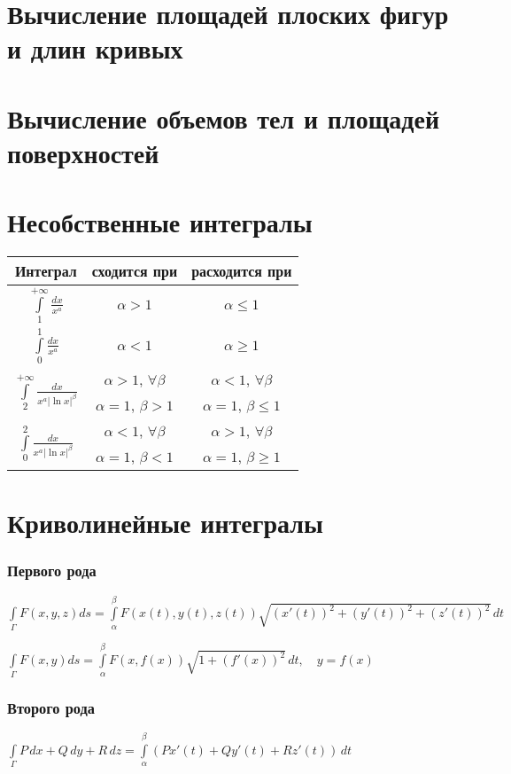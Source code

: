 \section{Вычисление площадей плоских фигур и длин кривых}



\section{Вычисление объемов тел и площадей поверхностей}

\section{Несобственные интегралы}
\begin{longtable}{|c|c|c|}
\hline Интеграл & сходится при & расходится при 
\\\hline $\int\limits_{1}^{+\infty} \frac{dx}{x^a}$ 
& $\alpha > 1$
& $\alpha \le 1$
\\\hline $\int\limits_{0}^{1} \frac{dx}{x^a}$
& $\alpha < 1$
& $\alpha \ge 1$
\\\hline \multirow{2}{*}{$\int\limits_{2}^{+\infty} \frac{dx}{x^a |\ln x|^{\beta}}$}
& $\alpha > 1$, $\forall \beta$
& $\alpha < 1$, $\forall \beta$
\\\cline{2-3} 
& $\alpha = 1$, $\beta > 1$
& $\alpha = 1$, $\beta \le 1$
\\\hline \multirow{2}{*}{$\int\limits_{0}^{2} \frac{dx}{x^a |\ln x|^{\beta}}$}
& $\alpha < 1$, $\forall \beta$
& $\alpha > 1$, $\forall \beta$
\\\cline{2-3} 
& $\alpha = 1$, $\beta < 1$
& $\alpha = 1$, $\beta \ge 1$
\\\hline
\end{longtable}

\section{Криволинейные интегралы}
\subsubsection{Первого рода}
$\int\limits_{\Gamma} F(x,y,z) ds = \int\limits_{\alpha}^{\beta} F(x(t),y(t),z(t))\sqrt{(x'(t))^2+(y'(t))^2+(z'(t))^2}\,dt$

$\int\limits_{\Gamma} F(x,y) ds = \int\limits_{\alpha}^{\beta} F(x,f(x))\sqrt{1+(f'(x))^2}\,dt, \quad y=f(x)$

\subsubsection{Второго рода}
$\int\limits_{\Gamma} P\,dx+Q\,dy+R\,dz=\int\limits_{\alpha}^{\beta} \left(P x'(t)+ Q y'(t)+ R z'(t)\right)\,dt$

